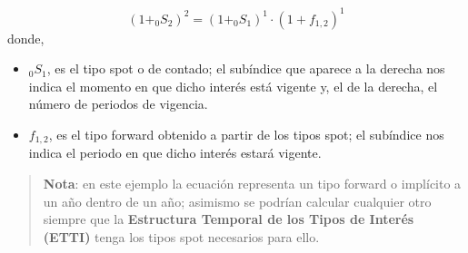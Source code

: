 \documentclass[
  letterpaper,
  DIV=11,
  numbers=noendperiod]{scrreprt}
\begin{document}
\begin{tcolorbox}
\[(1+_{0}S_{2})^{2}=(1+_{0}S_{1})^1\cdot(1+f_{1,2})^1\] donde,

\begin{itemize}
\item
  \(_{0}S_{1}\), es el tipo spot o de contado; el subíndice que aparece
  a la derecha nos indica el momento en que dicho interés está vigente
  y, el de la derecha, el número de periodos de vigencia.
\item
  \(f_{1,2}\), es el tipo forward obtenido a partir de los tipos spot;
  el subíndice nos indica el periodo en que dicho interés estará
  vigente.
\end{itemize}

\begin{quote}
\textbf{Nota}: en este ejemplo la ecuación representa un tipo forward o
implícito a un año dentro de un año; asimismo se podrían calcular
cualquier otro siempre que la \textbf{Estructura Temporal de los Tipos
de Interés (ETTI)} tenga los tipos spot necesarios para ello.
\end{quote}

\end{tcolorbox}
\end{document}
